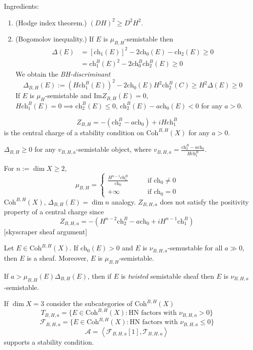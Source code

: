 Ingredients:
\begin{enumerate}
\item (Hodge index theorem.) $(DH)^2 \geq D^2 H^2$.
\item (Bogomolov inequality.) If $E$ is $\mu_{B,H}$-semistable then
\begin{align*}
\Delta(E)&=[\text{ch}_1(E)]^2-2\text{ch}_0(E)-\text{ch}_2(E)\geq 0\\
&=\text{ch}_1^B(E)^2-2\text{ch}_0^B\text{ch}_2^B(E)\geq 0
\end{align*}
We obtain the {\it BH-discriminant} 
$$
\Delta_{B,H}(E):=(H\text{ch}_1^B(E))^2-2\text{ch}_0(E)H^2\text{ch}_2^B(C)
\geq H^2\Delta(E)\geq 0
$$
If $E$ is $\mu_H$-semistable and $\text{Im}Z_{B,H}(E)=0$, $H\text{ch}_1^B(E)=0
\implies \text{ch}_2^B(E)\leq 0$, $\text{ch}_2^B(E)-a\text{ch}_0(E)<0$ 
for any $a>0$.
\end{enumerate}

\begin{theorem}
\label{theorem-Bridgeland-Areni-Bersum}
 $$
Z_{B,H}=-(\text{ch}_2^B-a\text{ch}_0)+iH\text{ch}_1^B
$$
is the central charge of a stability condition on $\text{Coh}^{B,H}(X)$ 
for any $a>0$.
\end{theorem}

\begin{theorem}
\label{theorem-BH-discriminant}
$\Delta_{B,H}\geq 0$ for any $v_{B,H,a}$-semistable object, where 
$v_{B,H,a}=\frac{\text{ch}_2^B-a\text{ch}_0}{H\text{ch}_1^B}$.
\end{theorem}

\medskip\noindent
For $n:=\dim X\geq 2$,
$$
\mu_{B,H}=
\begin{cases}
\frac{H^{n-1}\text{ch}_1^B}{\text{ch}_0}\qquad &\text{if }\text{ch}_0 \neq 0 \\
+\infty\qquad &\text{if }\text{ch}_0=0
\end{cases}
$$
$\text{Coh}^{B,H}(X)$, $\Delta_{B,H}(E)=\dim n$ analogy. $Z_{B,H,a}$ does not
satisfy the positivity property of a central charge since
$$
Z_{B,H,a}=-(H^{n-2}\text{ch}_2^B-a\text{ch}_0+iH^{n-1}\text{ch}_1^B)
$$
[skyscraper sheaf argument]

\begin{exercise}
\label{exercise-E-is-a-sheaf}
Let $E \in \text{Coh}^{B,H}(X)$.
If $\text{ch}_0(E)>0$ and $E$ is $\nu_{B,H,a}$-semustable for all $a\gg 0$, then
$E$ is a sheaf. Moreover, $E$ is $\mu_{B,H}$-semistable.
\end{exercise}

\begin{proposition}[Lo,---]
\label{proposition-}
If $a>\mu_{B,H}(E)\Delta_{B,H}(E)$, then if $E$ is {\it twisted} semistable
sheaf then $E$ is $\nu_{B,H,a}$-semistable.
\end{proposition}

\medskip\noindent
If $\dim X=3$ consider the subcategories of $\text{Coh}^{B,H}(X)$
$$
T_{B,H,a}=\{E \in \text{Coh}^{B,H}(X):\text{HN factors with }
\nu_{B,H,a}>0\}
$$
$$
\mathcal{F}_{B,H,a}=\{E \in \text{Coh}^{B,H}(X):\text{HN factors with }
\nu_{B,H,a}\leq 0\}

$$
$$
\mathcal{A}=\left<\mathcal{F}_{B,H,a}[1],\mathcal{T}_{B,H,a}\right>
$$
supports a stability condition.

